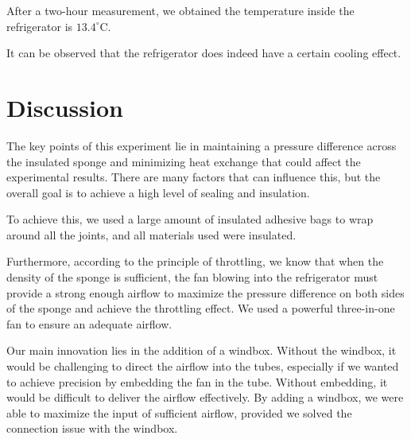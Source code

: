 \documentclass[12pt]{article}
\begin{document}
After a two-hour measurement, we obtained the temperature inside the refrigerator is $13.4^{\circ}$C.

It can be observed that the refrigerator does indeed have a certain cooling effect.

\section{Discussion}
\label{sec:con}
The key points of this experiment lie in maintaining a pressure difference across the insulated sponge and minimizing heat exchange that could affect the experimental results. There are many factors that can influence this, but the overall goal is to achieve a high level of sealing and insulation.

To achieve this, we used a large amount of insulated adhesive bags to wrap around all the joints, and all materials used were insulated.

Furthermore, according to the principle of throttling, we know that when the density of the sponge is sufficient, the fan blowing into the refrigerator must provide a strong enough airflow to maximize the pressure difference on both sides of the sponge and achieve the throttling effect. We used a powerful three-in-one fan to ensure an adequate airflow.

Our main innovation lies in the addition of a windbox. Without the windbox, it would be challenging to direct the airflow into the tubes, especially if we wanted to achieve precision by embedding the fan in the tube. Without embedding, it would be difficult to deliver the airflow effectively. By adding a windbox, we were able to maximize the input of sufficient airflow, provided we solved the connection issue with the windbox.
\end{document}
